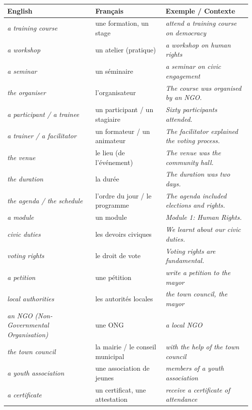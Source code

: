 \documentclass[11pt]{article}
\newcommand{\eng}[1]{\ifmmode\text{\textit{#1}}\else\begingroup\selectlanguage{english}\itshape #1\endgroup\fi}
\begin{document}
\begin{definition}
\begin{center}
\begin{tabularx}{\linewidth}{|X|X|X|}
\hline
\rowcolor{popblueL} \textbf{English} & \textbf{Français} & \textbf{Exemple / Contexte} \\
\hline
\eng{a training course} & une formation, un stage & \eng{attend a training course on democracy} \\
\eng{a workshop} & un atelier (pratique) & \eng{a workshop on human rights} \\
\eng{a seminar} & un séminaire & \eng{a seminar on civic engagement} \\
\eng{the organiser} & l'organisateur & \eng{The course was organised by an NGO.} \\
\eng{a participant / a trainee} & un participant / un stagiaire & \eng{Sixty participants attended.} \\
\eng{a trainer / a facilitator} & un formateur / un animateur & \eng{The facilitator explained the voting process.} \\
\eng{the venue} & le lieu (de l'événement) & \eng{The venue was the community hall.} \\
\eng{the duration} & la durée & \eng{The duration was two days.} \\
\eng{the agenda / the schedule} & l'ordre du jour / le programme & \eng{The agenda included elections and rights.} \\
\eng{a module} & un module & \eng{Module 1: Human Rights.} \\
\eng{civic duties} & les devoirs civiques & \eng{We learnt about our civic duties.} \\
\eng{voting rights} & le droit de vote & \eng{Voting rights are fundamental.} \\
\eng{a petition} & une pétition & \eng{write a petition to the mayor} \\
\eng{local authorities} & les autorités locales & \eng{the town council, the mayor} \\
\eng{an NGO (Non-Governmental Organisation)} & une ONG & \eng{a local NGO} \\
\eng{the town council} & la mairie / le conseil municipal & \eng{with the help of the town council} \\
\eng{a youth association} & une association de jeunes & \eng{members of a youth association} \\
\eng{a certificate} & un certificat, une attestation & \eng{receive a certificate of attendance} \\
\hline
\end{tabularx}
\end{center}
\end{definition}
\end{document}
